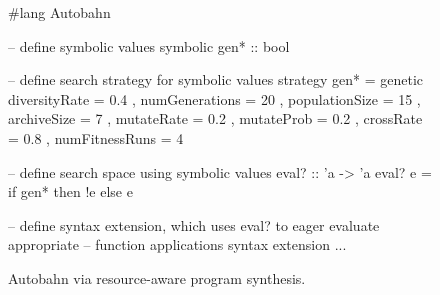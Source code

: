 \begin{figure}[t]
        
\centering
\begin{mylisting}
#lang Autobahn

-- define symbolic values
symbolic gen* :: bool

-- define search strategy for symbolic values
strategy gen* = 
  genetic { diversityRate = 0.4
            , numGenerations = 20
            , populationSize = 15
            , archiveSize = 7
            , mutateRate = 0.2
            , mutateProb = 0.2
            , crossRate = 0.8
            , numFitnessRuns = 4 }

-- define search space using symbolic values
eval? :: 'a -> 'a
eval? e =
  if gen* then
    !e
  else
    e

-- define syntax extension, which uses eval? to eager evaluate appropriate
-- function applications
syntax extension ...
\end{mylisting}
\caption{Autobahn via resource-aware program synthesis.  
}
\label{fig:autobahn-via-synthesis}
\end{figure}

